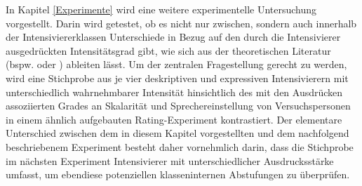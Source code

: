 In Kapitel \ref{Experimente} wird eine weitere experimentelle Untersuchung vorgestellt. Darin wird getestet, ob es nicht nur zwischen, sondern auch innerhalb der Intensiviererklassen Unterschiede in Bezug auf den durch die Intensivierer ausgedrückten Intensitätsgrad gibt, wie sich aus der theoretischen Literatur (bspw. {\citealt[87]{Biedermann.1969}} oder {\citealt[408]{Breindl.2007}}) ableiten lässt. Um der zentralen Fragestellung gerecht zu werden, wird eine Stichprobe aus je vier deskriptiven und expressiven Intensivierern mit unterschiedlich wahrnehmbarer Intensität hinsichtlich des mit den Ausdrücken assoziierten Grades an Skalarität und Sprechereinstellung von Versuchspersonen in einem ähnlich aufgebauten Rating-Experiment kontrastiert. Der elementare Unterschied zwischen dem in diesem Kapitel vorgestellten und dem nachfolgend beschriebenem Experiment besteht daher vornehmlich darin, dass die Stichprobe im nächsten Experiment Intensivierer mit unterschiedlicher Ausdrucksstärke umfasst, um ebendiese potenziellen klasseninternen Abstufungen zu überprüfen.










